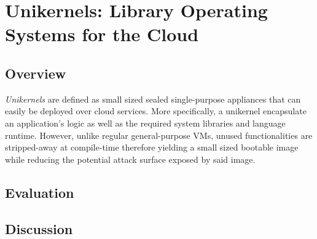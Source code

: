 \section{Unikernels: Library Operating Systems for the Cloud}

\subsection{Overview}
\textit{Unikernels} are defined as small sized sealed single-purpose appliances that can easily be deployed over cloud services.
More specifically, a unikernel encapsulate an application's logic as well as the required system libraries and language runtime.
However, unlike regular general-purpose VMs, unused functionalities are stripped-away at compile-time therefore yielding a small sized bootable image while reducing the potential attack surface exposed by said image.

\subsection{Evaluation}

\subsection{Discussion}